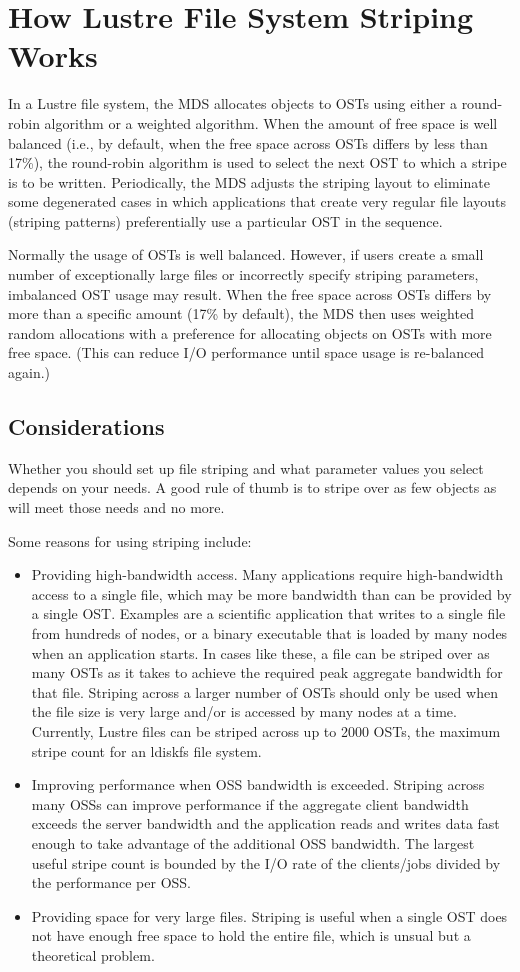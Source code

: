\documentclass{article}
\begin{document}
\section{How Lustre File System Striping Works}
In a Lustre file system, the MDS allocates objects to OSTs using either a round-robin algorithm or a weighted algorithm. When the amount of free space is well balanced (i.e., by default, when the free space across OSTs differs by less than 17\%), the round-robin algorithm is used to select the next OST to which a stripe is to be written. Periodically, the MDS adjusts the striping layout to eliminate some degenerated cases in which applications that create very regular file layouts (striping patterns) preferentially use a particular OST in the sequence.

Normally the usage of OSTs is well balanced. However, if users create a small number of exceptionally large files or incorrectly specify striping parameters, imbalanced OST usage may result. When the free space across OSTs differs by more than a specific amount (17\% by default), the MDS then uses weighted random allocations with a preference for allocating objects on OSTs with more free space. (This can reduce I/O performance until space usage is re-balanced again.) 
\subsection{Considerations}
Whether you should set up file striping and what parameter values you select depends on your needs. A good rule of thumb is to stripe over as few objects as will meet those needs and no more.

Some reasons for using striping include:
\begin{itemize}
    \item Providing high-bandwidth access. Many applications require high-bandwidth access to a single file, which may be more bandwidth than can be provided by a single OST. Examples are a scientific application that writes to a single file from hundreds of nodes, or a binary executable that is loaded by many nodes when an application starts. In cases like these, a file can be striped over as many OSTs as it takes to achieve the required peak aggregate bandwidth for that file. Striping across a larger number of OSTs should only be used when the file size is very large and/or is accessed by many nodes at a time. Currently, Lustre files can be striped across up to 2000 OSTs, the maximum stripe count for an ldiskfs file system.
    \item Improving performance when OSS bandwidth is exceeded. Striping across many OSSs can improve performance if the aggregate client bandwidth exceeds the server bandwidth and the application reads and writes data fast enough to take advantage of the additional OSS bandwidth. The largest useful stripe count is bounded by the I/O rate of the clients/jobs divided by the performance per OSS.
    \item Providing space for very large files. Striping is useful when a single OST does not have enough free space to hold the entire file, which is unsual but a theoretical problem.
\end{itemize}
\end{document}
